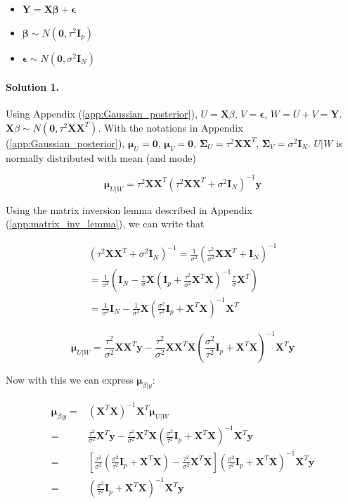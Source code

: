 \documentclass{article}
\begin{document}
\begin{itemize}
    \item $\bm{Y} = \bm{X}\bm{\beta} + \bm{\epsilon}$
    \item $\bm{\beta} \sim N(\bm{0}, \tau^2 \bm{I}_p)$
    \item $\bm{\epsilon} \sim N(\bm{0}, \sigma^2 \bm{I}_N)$
\end{itemize}

\paragraph{Solution 1.} Using Appendix (\ref{app:Gaussian_posterior}), $U=\bm{X}\beta$, $V=\bm{\epsilon}$, $W=U+V=\bm{Y}$. $\bm{X}\beta \sim N(\bm{0}, \tau^2 \bm{X}\bm{X}^T)$. With the notations in Appendix (\ref{app:Gaussian_posterior}), $\bm{\mu}_U=\bm{0}$, $\bm{\mu}_V = \bm{0}$, $\bm{\Sigma}_U = \tau^2 \bm{X}\bm{X}^T$, $\bm{\Sigma}_V = \sigma^2 \bm{I}_N$. $U|W$ is normally distributed with mean (and mode)

\[
\bm{\mu}_{U|W} = \tau^2 \bm{X}\bm{X}^T (\tau^2\bm{X}\bm{X}^T + \sigma^2 \bm{I}_N)^{-1}\bm{y}
\]

Using the matrix inversion lemma described in Appendix (\ref{app:matrix_inv_lemma}), we can write that

\[
\begin{split}
(\tau^2\bm{X}\bm{X}^T + \sigma^2 \bm{I}_N)^{-1} = \frac{1}{\sigma^2}\left(\frac{\tau^2}{\sigma^2}\bm{X}\bm{X}^T + \bm{I}_N\right)^{-1}\\ =\frac{1}{\sigma^2}\left( \bm{I}_N - \frac{\tau}{\sigma} \bm{X}\left(\bm{I}_p + \frac{\tau^2}{\sigma^2}\bm{X}^T\bm{X}\right)^{-1}\frac{\tau}{\sigma}\bm{X}^T \right)\\
=\frac{1}{\sigma^2} \bm{I}_N - \frac{1}{\sigma^2} \bm{X}\left(\frac{\sigma^2}{\tau^2}\bm{I}_p + \bm{X}^T\bm{X}\right)^{-1}\bm{X}^T
\end{split}
\]

\[
\bm{\mu}_{U|W}=\frac{\tau^2}{\sigma^2} \bm{X}\bm{X}^T\bm{y} - \frac{\tau^2}{\sigma^2}\bm{X}\bm{X}^T \bm{X}\left(\frac{\sigma^2}{\tau^2}\bm{I}_p + \bm{X}^T\bm{X}\right)^{-1}\bm{X}^T\bm{y}
\]

Now with this we can express $\bm{\mu}_{\beta|y}$:

\[
\begin{split}
\bm{\mu}_{\beta|y} =& (\bm{X}^T\bm{X})^{-1}\bm{X}^T \bm{\mu}_{U|W}\\
=& \frac{\tau^2}{\sigma^2} \bm{X}^T\bm{y} - \frac{\tau^2}{\sigma^2}\bm{X}^T \bm{X}\left(\frac{\sigma^2}{\tau^2}\bm{I}_p + \bm{X}^T\bm{X}\right)^{-1}\bm{X}^T\bm{y}\\
=& \left[\frac{\tau^2}{\sigma^2} \left(\frac{\sigma^2}{\tau^2}\bm{I}_p + \bm{X}^T\bm{X}\right) - \frac{\tau^2}{\sigma^2}\bm{X}^T \bm{X}\right]\left(\frac{\sigma^2}{\tau^2}\bm{I}_p + \bm{X}^T\bm{X}\right)^{-1}\bm{X}^T\bm{y}\\
=& \left(\frac{\sigma^2}{\tau^2}\bm{I}_p + \bm{X}^T\bm{X}\right)^{-1}\bm{X}^T\bm{y}
\end{split}
\]
\end{document}
